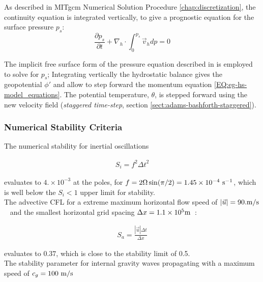 As described in MITgcm Numerical Solution Procedure \ref{chap:discretization}, 
the continuity equation is integrated vertically, to give a prognostic
equation for the surface pressure $p_s$:
\begin{equation}
\frac{\partial p_s}{\partial t} + \nabla_{h}\cdot \int_{0}^{p_s} \vec{v}_h dp
= 0
\end{equation}

The implicit free surface form of the pressure equation described in 
\cite{marshall:97a} is employed to solve for $p_s$; 
Integrating vertically the hydrostatic balance 
gives the geopotential $\phi'$ and allow to step forward the momentum equation
\ref{EQ:eg-hs-model_equations}.
The potential temperature, $\theta$, is stepped forward using the 
new velocity field ({\it staggered time-step}, section 
\ref{sect:adams-bashforth-staggered}).
\\

\subsubsection{Numerical Stability Criteria}
\label{www:tutorials}

\noindent The numerical stability for inertial oscillations
\cite{adcroft:95} 

\begin{eqnarray}
\label{EQ:eg-hs-inertial_stability}
S_{i} = f^{2} {\Delta t}^2
\end{eqnarray}

\noindent evaluates to $4.\times10^{-3}$ at the poles, 
for $f=2\Omega\sin(\pi / 2) =1.45\times10^{-4}~{\rm s}^{-1}$, 
which is well below the $S_{i} < 1$ upper limit for stability.
\\

\noindent The advective CFL \cite{adcroft:95} 
for a extreme maximum horizontal flow speed of $ | \vec{u} | = 90. {\rm m/s}$~ 
and the smallest horizontal grid spacing $ \Delta x = 1.1\times10^5 {\rm m}$~:

\begin{eqnarray}
\label{EQ:eg-hs-cfl_stability}
S_{a} = \frac{| \vec{u} | \Delta t}{ \Delta x}
\end{eqnarray}

\noindent evaluates to $0.37$, which is close to the stability 
limit of 0.5.
\\

\noindent The stability parameter for internal gravity waves propagating
with a maximum speed of $c_{g}=100~{\rm m/s}$
\cite{adcroft:95}

